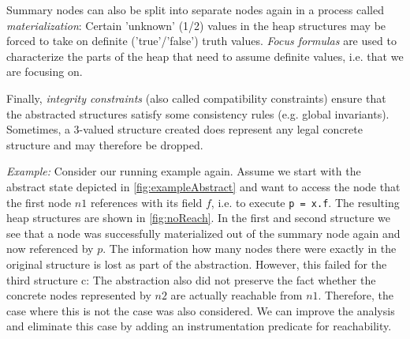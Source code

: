 \documentclass[11pt,a4paper,english]{article}
\begin{document}
Summary nodes can also be split into separate nodes again in a process
called \textit{materialization}: Certain 'unknown' (1/2) values in the heap
structures may be forced to take on definite ('true'/'false') truth values.
\textit{Focus formulas} are used to characterize the parts of the heap that need to
assume definite values, i.e. that we are focusing on. 

Finally, \textit{integrity constraints} (also called compatibility constraints)
ensure that the abstracted structures satisfy some consistency rules (e.g.
global invariants). Sometimes, a 3-valued structure created does represent any
legal concrete structure and may therefore be dropped.

\textit{Example: } Consider our running example again. Assume we start with the
abstract state depicted in \autoref{fig:exampleAbstract} and want to access the
node that the first node $n1$ references with its field $f$, i.e. to execute
\texttt{p = x.f}. The resulting heap structures are shown in
\autoref{fig:noReach}. In the first and second structure we see that a node was
successfully materialized out of the summary node again and now referenced by
$p$. The information how many nodes there were exactly in the original structure
is lost as part of the abstraction. However, this failed for the third structure
 c: The abstraction also did not preserve the fact whether
the concrete nodes represented by $n2$ are actually reachable from $n1$.
Therefore, the case where this is not the case  was also considered.  We can
improve the analysis and eliminate this case by adding an instrumentation
predicate for reachability.
\end{document}
